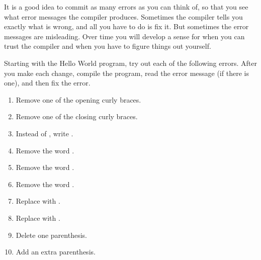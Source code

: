 \begin{exercise}  %

It is a good idea to commit as many errors as you can think of, so that you see what error messages the compiler produces.
Sometimes the compiler tells you exactly what is wrong, and all you have to do is fix it.
But sometimes the error messages are misleading.
Over time you will develop a sense for when you can trust the compiler and when you have to figure things out yourself.

Starting with the Hello World program, try out each of the following errors.
After you make each change, compile the program, read the error message (if there is one), and then fix the error.

\begin{enumerate}
\item Remove one of the opening curly braces.
\item Remove one of the closing curly braces.
\item Instead of , write .
\item Remove the word .
\item Remove the word .
\item Remove the word .
\item Replace  with .
\item Replace  with .
\item Delete one parenthesis.
\item Add an extra parenthesis.
\end{enumerate}

\end{exercise}
